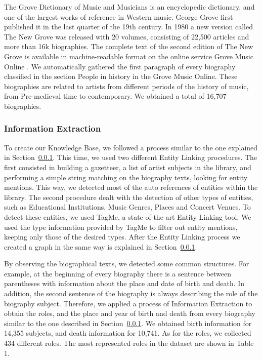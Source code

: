 The Grove Dictionary of Music and Musicians is an encyclopedic dictionary, and one of the largest works of reference in Western music. George Grove first published it in the last quarter of the 19th century. In 1980 a new version called The New Grove  was released with 20 volumes, consisting of 22,500 articles and more than 16k biographies. The complete text of the second edition of The New Grove is available in machine-readable format on the online service Grove Music Online .
We automatically gathered the first paragraph of every biography classified in the section People in history in the Grove Music Online. These biographies are related to artists from different periods of the history of music, from Pre-medieval time to contemporary. We obtained a total of 16,707 biographies.

\subsubsection{Information Extraction}

To create our Knowledge Base, we followed a process similar to the one explained in Section~\ref{}. This time, we used two different Entity Linking procedures.
The first consisted in building a gazetteer, a list of artist subjects in the library, and performing a simple string matching on the biography texts, looking for entity mentions. This way, we detected most of the auto references of entities within the library. The second procedure dealt with the detection of other types of entities, such as Educational Institutions, Music Genres, Places and Concert Venues. To detect these entities, we used TagMe, a state-of-the-art Entity Linking tool. 
We used the type information provided by TagMe to filter out entity mentions, keeping only those of the desired types. After the Entity Linking process we created a graph in the same way is explained in Section~\ref{}.

By observing the biographical texts, we detected some common structures. For example, at the beginning of every biography there is a sentence between parentheses with information about the place and date of birth and death. In addition, the second sentence of the biography is always describing the role of the biography subject. Therefore, we applied a process of Information Extraction to obtain the roles, and the place and year of birth and death from every biography similar to the one described in Section~\ref{}. We obtained birth information for 14,355 subjects, and death information for 10,741. As for the roles, we collected 434 different roles. The most represented roles in the dataset are shown in Table 1. 

